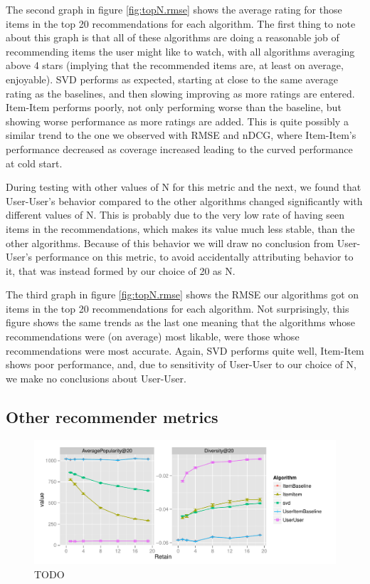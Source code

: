 \documentclass[letterpaper]{sig-alternate}
\begin{document}
  The second graph in figure \ref{fig:topN.rmse} shows the average rating for those items in the top 20 recommendations for each algorithm.
  The first thing to note about this graph is that all of these algorithms are doing a reasonable job of recommending items the user might like to watch, with all algorithms averaging above 4 stars (implying that the recommended items are, at least on average, enjoyable).
  SVD performs as expected, starting at close to the same average rating as the baselines, and then slowing improving as more ratings are entered.
  Item-Item performs poorly, not only performing worse than the baseline, but showing worse performance as more ratings are added.
  This is quite possibly a similar trend to the one we observed with RMSE and nDCG, where Item-Item's performance decreased as coverage increased leading to the curved performance at cold start.
  
  During testing with other values of N for this metric and the next, we found that User-User's behavior compared to the other algorithms changed significantly with different values of N.
  This is probably due to the very low rate of having seen items in the recommendations, which makes its value much less stable, than the other algorithms.
  Because of this behavior we will draw no conclusion from User-User's performance on this metric, to avoid accidentally attributing behavior to it, that was instead formed by our choice of 20 as N.
  
  The third graph in figure \ref{fig:topN.rmse} shows the RMSE our algorithms got on items in the top 20 recommendations for each algorithm.
  Not surprisingly, this figure shows the same trends as the last one meaning that the algorithms whose recommendations were (on average) most likable, were those whose recommendations were most accurate.
  Again, SVD performs quite well, Item-Item shows poor performance, and, due to sensitivity of User-User to our choice of N, we make no conclusions about User-User.

\subsection{Other recommender metrics}

\begin{figure}[ht!]
  \centering
  \includegraphics[width=\linewidth]{../lenskit/output/ekstrandTuned20/popdiv.pdf}
  \caption{TODO}
  \label{fig:pop}
\end{figure}
\end{document}
